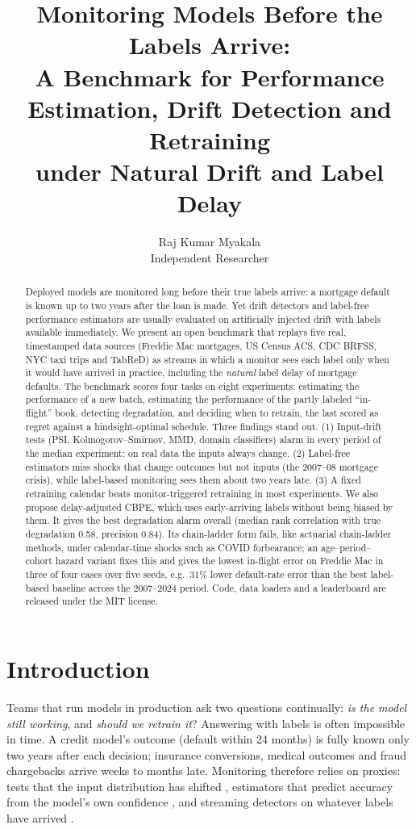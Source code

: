 \documentclass[11pt]{article}
\title{Monitoring Models Before the Labels Arrive:\\
A Benchmark for Performance Estimation, Drift Detection and Retraining\\
under Natural Drift and Label Delay}
\author{Raj Kumar Myakala\\ Independent Researcher\\}
\date{}
\begin{document}
\maketitle

\begin{abstract}
Deployed models are monitored long before their true labels arrive: a mortgage default is
known up to two years after the loan is made. Yet drift detectors and label-free performance
estimators are usually evaluated on artificially injected drift with labels available
immediately. We present an open benchmark that replays five real, timestamped data sources
(Freddie Mac mortgages, US Census ACS, CDC BRFSS, NYC taxi trips and TabReD) as streams in which a
monitor sees each label only when it would have arrived in practice, including the
\emph{natural} label delay of mortgage defaults. The benchmark scores four tasks on eight
experiments: estimating the performance of a new batch, estimating the performance of the
partly labeled ``in-flight'' book, detecting degradation, and deciding when to retrain,
the last scored as regret against a hindsight-optimal schedule. Three findings stand out.
(1) Input-drift tests (PSI, Kolmogorov--Smirnov, MMD, domain classifiers) alarm in every
period of the median experiment: on real data the inputs always change. (2) Label-free
estimators miss shocks that change outcomes but not inputs (the 2007--08 mortgage
crisis), while label-based monitoring sees them about two years late. (3) A fixed retraining
calendar beats monitor-triggered retraining in most experiments. We also propose
delay-adjusted CBPE, which uses early-arriving labels without being biased by them. It gives
the best degradation alarm overall (median rank correlation with true degradation 0.58,
precision 0.84). Its chain-ladder form fails, like actuarial chain-ladder methods, under
calendar-time shocks such as COVID forbearance; an age--period--cohort hazard variant fixes
this and gives the lowest in-flight error on Freddie Mac in three of four cases over five
seeds, e.g.\ 31\% lower default-rate error than the best label-based baseline across the
2007--2024 period. Code, data loaders and a leaderboard are released under the MIT license.
\end{abstract}

\section{Introduction}

Teams that run models in production ask two questions continually: \emph{is the model still
working}, and \emph{should we retrain it}? Answering with labels is often impossible in time.
A credit model's outcome (default within 24 months) is fully known only two years after each
decision; insurance conversions, medical outcomes and fraud chargebacks arrive weeks to months
late. Monitoring therefore relies on proxies: tests that the input distribution has shifted
\citep{rabanser2019failing,gretton2012kernel}, estimators that predict accuracy from the model's
own confidence \citep{garg2022atc,guillory2021doc,nannyml}, and streaming detectors on whatever
labels have arrived \citep{bifet2007adwin,gama2014survey}.
\end{document}
